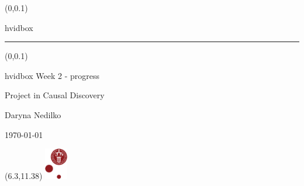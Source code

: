 \documentclass[t,24pt,aspectratio=169]{beamer}
\begin{document}
{
\begin{frame}
    \begin{textblock*}{\textwidth}(0\textwidth,0.1\textheight)
        \begin{beamercolorbox}[wd=7.8cm,ht=7.3cm,sep=0.5cm]{hvidbox}
            \fontsize{5}{10}\selectfont {}
            \noindent\textcolor{KUrod}{\rule{6.8cm}{0.4pt}}
        \end{beamercolorbox}
    \end{textblock*}
    \begin{textblock*}{\textwidth}(0\textwidth,0.1\textheight)
        \begin{beamercolorbox}[wd=7.8cm,sep=0.5cm]{hvidbox}
                \Huge \textcolor{KUrod}{Week 2 - progress}
                \vspace{0.5cm}
                \par
                \Large Project in Causal Discovery
                \vspace{0.5cm}
                \par
                \normalsize Daryna Nedilko
                
                \today
        \end{beamercolorbox}
    \end{textblock*}
    \begin{textblock}{1}(6.3,11.38)
        \includegraphics[width=1cm]{KU/KU-logo.png}
    \end{textblock}
\end{frame}
}
\end{document}
